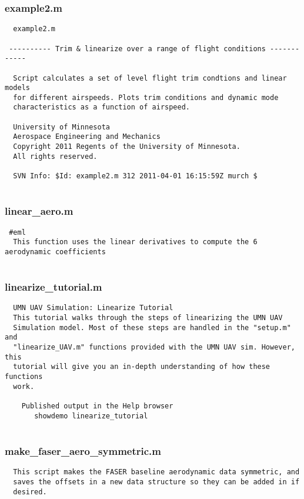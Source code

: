 \documentclass[12pt]{article}
\begin{document}
\subsubsection{example2.m}
\begin{verbatim}
  example2.m
  
 ---------- Trim & linearize over a range of flight conditions ------------
 
  Script calculates a set of level flight trim condtions and linear models
  for different airspeeds. Plots trim conditions and dynamic mode
  characteristics as a function of airspeed.
 
  University of Minnesota 
  Aerospace Engineering and Mechanics 
  Copyright 2011 Regents of the University of Minnesota. 
  All rights reserved.
 
  SVN Info: $Id: example2.m 312 2011-04-01 16:15:59Z murch $


\end{verbatim}

\subsubsection{linear\_aero.m}
\begin{verbatim}
 #eml
  This function uses the linear derivatives to compute the 6 aerodynamic coefficients


\end{verbatim}

\subsubsection{linearize\_tutorial.m}
\begin{verbatim}
  UMN UAV Simulation: Linearize Tutorial
  This tutorial walks through the steps of linearizing the UMN UAV
  Simulation model. Most of these steps are handled in the "setup.m" and
  "linearize_UAV.m" functions provided with the UMN UAV sim. However, this
  tutorial will give you an in-depth understanding of how these functions
  work.

    Published output in the Help browser
       showdemo linearize_tutorial


\end{verbatim}

\subsubsection{make\_faser\_aero\_symmetric.m}
\begin{verbatim}
  This script makes the FASER baseline aerodynamic data symmetric, and
  saves the offsets in a new data structure so they can be added in if
  desired.


\end{verbatim}
\end{document}
